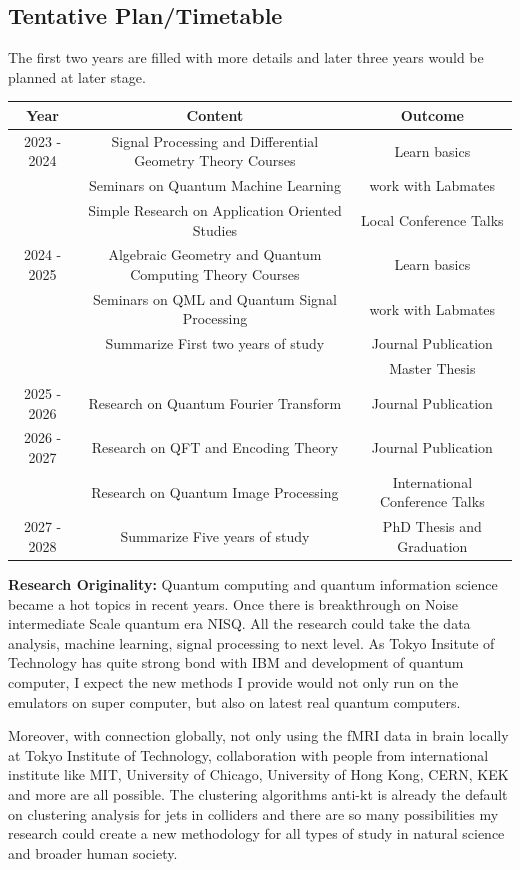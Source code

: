 \documentclass{article}
\begin{document}
\subsection{Tentative Plan/Timetable}
The first two years are filled with more details 
and later three years would be planned at later stage. 

\begin{center}
  \begin{tabular}{c|c|c}
    Year & Content & Outcome \\
    \hline
    2023 - 2024 &  Signal Processing and Differential Geometry Theory Courses& Learn basics \\
                &  Seminars on Quantum Machine Learning &  work with Labmates \\
                &  Simple Research on Application Oriented Studies & Local Conference Talks \\ 
    2024 - 2025 &  Algebraic Geometry and Quantum Computing Theory Courses & Learn basics \\
                &  Seminars on QML and Quantum Signal Processing  & work with Labmates \\
                &  Summarize First two years of study & Journal Publication \\
                & & Master Thesis \\
    \hline
    2025 - 2026 &  Research on Quantum Fourier Transform  & Journal Publication\\
    2026 - 2027 &  Research on QFT and Encoding Theory  & Journal Publication \\
    & Research on Quantum Image Processing & International Conference Talks \\
    2027 - 2028 &  Summarize Five years of study & PhD Thesis and Graduation 
  \end{tabular}
\end{center}


\textbf{Research Originality:}
Quantum computing and quantum information science became a hot topics in 
recent years. 
Once there is breakthrough on Noise intermediate Scale quantum era NISQ. All 
the research could take the data analysis, machine learning, signal processing 
to next level. As Tokyo Insitute of Technology has quite strong bond with 
IBM and development of quantum computer, I expect the new methods I provide 
would not only run on the emulators on super computer, but also on latest real 
quantum computers.

Moreover, with connection globally, not only using the fMRI data in brain locally 
at Tokyo Institute of Technology, collaboration with people from international 
institute like MIT, University of Chicago, University of Hong Kong, CERN, KEK and 
more are all possible. The clustering algorithms anti-kt is already the 
default on clustering analysis for jets in colliders and there are so 
many possibilities my research could create a new methodology for 
all types of study in natural science and broader human society. 
\end{document}
